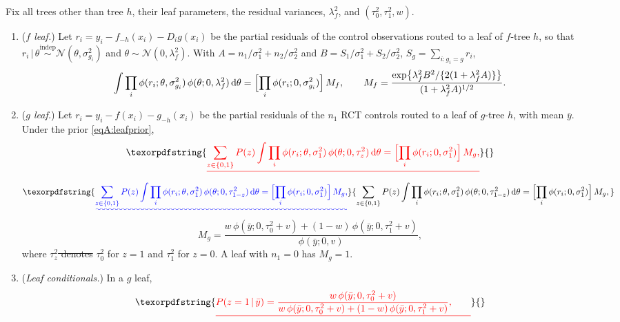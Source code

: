 \documentclass[11pt]{article}
\newcommand{\Normal}{\mathcal{N}}
\newcommand{\given}{\,\vert\,}
\newcommand{\dd}{\mathrm{d}}
\newcommand{\indep}{\stackrel{\text{indep}}{\sim}}
\theoremstyle{definition}
\theoremstyle{plain}
\providecommand{\DIFaddtex}[1]{{\protect\color{blue}\uwave{#1}}} %
\providecommand{\DIFdeltex}[1]{{\protect\color{red}\sout{#1}}}                      %
\providecommand{\DIFaddbegin}{} %
\providecommand{\DIFaddend}{} %
\providecommand{\DIFdelbegin}{} %
\providecommand{\DIFdelend}{} %
\providecommand{\DIFadd}[1]{\texorpdfstring{\DIFaddtex{#1}}{#1}} %
\providecommand{\DIFdel}[1]{\texorpdfstring{\DIFdeltex{#1}}{}} %
\newcommand{\DIFscaledelfig}{0.5}
\newlength{\DIFdelgraphicswidth} %
\newlength{\DIFdelgraphicsheight} %
\newcommand{\DIFaddincludegraphics}[2][]{{\color{blue}\fbox{\DIFOincludegraphics[#1]{#2}}}} %
\newcommand{\DIFdelincludegraphics}[2][]{%
\sbox{\DIFdelgraphicsbox}{\DIFOincludegraphics[#1]{#2}}%
\settoboxwidth{\DIFdelgraphicswidth}{\DIFdelgraphicsbox} %
\settoboxtotalheight{\DIFdelgraphicsheight}{\DIFdelgraphicsbox} %
\scalebox{\DIFscaledelfig}{%
\parbox[b]{\DIFdelgraphicswidth}{\usebox{\DIFdelgraphicsbox}\\[-\baselineskip] \rule{\DIFdelgraphicswidth}{0em}}\llap{\resizebox{\DIFdelgraphicswidth}{\DIFdelgraphicsheight}{%
\setlength{\unitlength}{\DIFdelgraphicswidth}%
\begin{picture}(1,1)%
\thicklines\linethickness{2pt} %
{\color[rgb]{1,0,0}\put(0,0){\framebox(1,1){}}}%
{\color[rgb]{1,0,0}\put(0,0){\line( 1,1){1}}}%
{\color[rgb]{1,0,0}\put(0,1){\line(1,-1){1}}}%
\end{picture}%
}\hspace*{3pt}}} %
} %
\DeclareRobustCommand{\DIFaddbegin}{\DIFOaddbegin \let\includegraphics\DIFaddincludegraphics} %
\DeclareRobustCommand{\DIFaddend}{\DIFOaddend \let\includegraphics\DIFOincludegraphics} %
\DeclareRobustCommand{\DIFdelbegin}{\DIFOdelbegin \let\includegraphics\DIFdelincludegraphics} %
\DeclareRobustCommand{\DIFdelend}{\DIFOaddend \let\includegraphics\DIFOincludegraphics} %
\begin{document}
{\begin{lemA}\label{lem:marg}
Fix all trees other than tree $h$, their leaf parameters, the residual variances, $\lambda_f^2$, and $(\tau_0^2,\tau_1^2,w)$.
\begin{enumerate}[label=(\alph*),leftmargin=2.2em]
\item (\emph{$f$ leaf.}) Let $r_i=y_i-f_{-h}(x_i)-D_ig(x_i)$ be the partial residuals of the control observations routed to a leaf of $f$-tree $h$, so that $r_i\given\theta\indep\Normal(\theta,\sigma^2_{g_i})$ and $\theta\sim\Normal(0,\lambda_f^2)$. With $A=n_1/\sigma_1^2+n_2/\sigma_2^2$ and $B=S_1/\sigma_1^2+S_2/\sigma_2^2$, $S_g=\sum_{i:g_i=g}r_i$,
\begin{equation}
\int\prod_i\phi(r_i;\theta,\sigma^2_{g_i})\,\phi(\theta;0,\lambda_f^2)\,\dd\theta
=\Bigl[\prod_i\phi(r_i;0,\sigma^2_{g_i})\Bigr]\,M_f,\qquad
M_f=\frac{\exp\bigl\{\lambda_f^2B^2/\{2(1+\lambda_f^2A)\}\bigr\}}{(1+\lambda_f^2A)^{1/2}}.
\label{eqA:Mf}
\end{equation}
\item (\emph{$g$ leaf.}) Let $r_i=y_i-f(x_i)-g_{-h}(x_i)$ be the partial residuals of the $n_1$ RCT controls routed to a leaf of $g$-tree $h$, with mean $\bar y$. Under the prior \eqref{eqA:leafprior},
\DIFdelbegin \begin{displaymath}
\DIFdel{\sum_{z\in\{0,1\}}P(z)\int\prod_i\phi(r_i;\theta,\sigma_1^2)\,\phi(\theta;0,\tau_z^2)\,\dd\theta
=\Bigl[\prod_i\phi(r_i;0,\sigma_1^2)\Bigr]\,M_g,
}\end{displaymath}%
\DIFdelend \DIFaddbegin \begin{equation}
\DIFadd{\sum_{z\in\{0,1\}}P(z)\int\prod_i\phi(r_i;\theta,\sigma_1^2)\,\phi(\theta;0,\tau_{1-z}^2)\,\dd\theta
=\Bigl[\prod_i\phi(r_i;0,\sigma_1^2)\Bigr]\,M_g,
\label{eqA:Mg}
}\end{equation}\DIFaddend
\begin{equation}
M_g=\frac{w\,\phi(\bar y;0,\tau_0^2+v)+(1-w)\,\phi(\bar y;0,\tau_1^2+v)}{\phi(\bar y;0,v)},
\label{eq:Mg2}
\end{equation}
where \DIFdelbegin \DIFdel{$\tau_z^2$ denotes }\DIFdelend \DIFaddbegin \DIFadd{the index $1-z$ selects }\DIFaddend $\tau_0^2$ for $z=1$ and $\tau_1^2$ for $z=0$. A leaf with $n_1=0$ has $M_g=1$.
\item (\emph{Leaf conditionals.}) In a $g$ leaf,
\DIFdelbegin \begin{displaymath}
\DIFdel{P(z=1\given\bar y)=\frac{w\,\phi(\bar y;0,\tau_0^2+v)}{w\,\phi(\bar y;0,\tau_0^2+v)+(1-w)\,\phi(\bar y;0,\tau_1^2+v)},\qquad
}
\end{displaymath}
\end{enumerate}
\end{lemA}}
\end{document}
